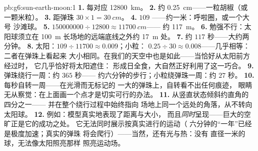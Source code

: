 \begin{solution}{pb:g6:sun-earth-moon:1}
\textbf{1.} 每对应 \qty{12800}{km}。
\textbf{2.} 约 \qty{0.25}{cm}——一粒胡椒（或一颗米粒）。
\textbf{3.} 距弹珠 $30 \times 1 = \qty{30}{cm}$。
\textbf{4.} $109$ ——约一米：呼啦圈，或一个大号
沙滩球。
\textbf{5.} $150000000 \div 12800 \approx \qty{11700}{cm}$——
约 \qty{117}{m}。
\textbf{6.} 勉强不行：太阳球须立在
\qty{100}{m} 长场地的远端底线之外约 \qty{17}{m} 处。
\textbf{7.} 约 $117$ 秒——大约两分钟。
\textbf{8.} 太阳：$109 \div 11700 \approx 0.009$；小粒：
$0.25 \div 30 \approx 0.008$——几乎相等：二者在弹珠上看起来
大小相同。在我们的天空中也是如此——当恰好从太阳前方经过时，
它几乎恰好将太阳遮住：
形成日全食，大自然正好利用了这一巧合。
\textbf{9.} 弹珠绕行一周：约 $365$ 秒——
约六分钟的步行；小粒绕弹珠一周：约
$27$ 秒。
\textbf{10.} 每秒自转一周——在光滑而无标记的
一大的弹珠上，自转看不出任何痕迹，
眼睛无从察觉：在上面画一个点才是切实可行的办法。
\textbf{11.} 从竖直状态倾斜约直角的四分之一——
并在整个绕行过程中始终指向
场地上同一个远处的角落，从不转向
太阳球。
\textbf{12.} 例如：模型真实地表现了距离与大小，
而且\emph{同时}呈现——巨大的空旷正是它的成功之处。
它无法同时展示按真实进行的运动（
六分钟的“一年”已经是极度加速；真实的弹珠
将会爬行）——当然，还有光与热：没有
直径一米的球，无法像太阳照亮那样
照亮运动场。
\end{solution}
